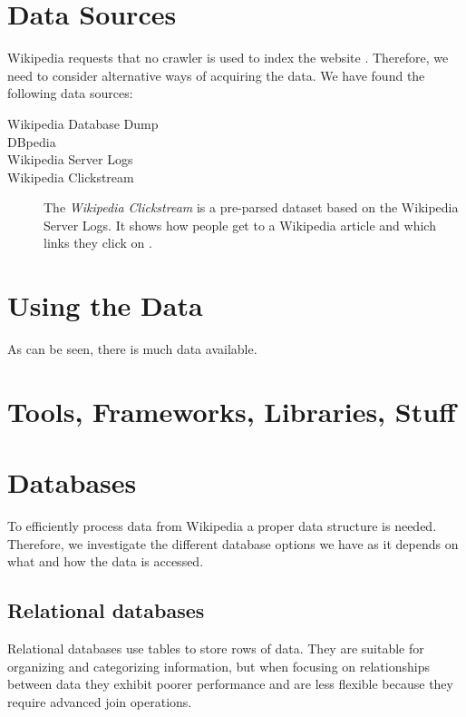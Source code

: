 \section{Data Sources}\label{sec:datasources}
Wikipedia requests that no crawler is used to index the website . Therefore, we need to consider alternative ways of acquiring the data. We have found the following data sources:
\begin{description}
  \item[Wikipedia Database Dump]
  \item[DBpedia]
  \item[Wikipedia Server Logs] 
  \item[Wikipedia Clickstream] The \emph{Wikipedia Clickstream} is a pre-parsed dataset based on the Wikipedia Server Logs. It shows how people get to a Wikipedia article and which links they click on \cite{wiki-clickstream}.
\end{description}

\section{Using the Data}

As can be seen, there is much data available. 

\section{Tools, Frameworks, Libraries, Stuff}\label{sec:selecting_tools}

\section{Databases}
To efficiently process data from Wikipedia a proper data structure is needed. Therefore, we investigate the different database options we have as it depends on what and how the data is accessed.

\subsection{Relational databases}
Relational databases use tables to store rows of data. They are suitable for organizing and categorizing information, but when focusing on relationships between data they exhibit poorer performance and are less flexible because they require advanced join operations.

